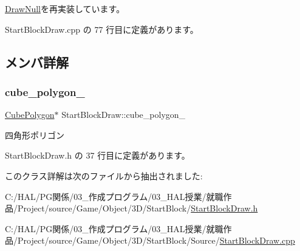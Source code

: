 \mbox{\hyperlink{class_draw_null_ad32a508d269de7eda8ad24ea72230464}{Draw\+Null}}を再実装しています。



 Start\+Block\+Draw.\+cpp の 77 行目に定義があります。



\subsection{メンバ詳解}
\mbox{\label{class_start_block_draw_a5aa6b756335a16f05c9b0d4457eb0883}} 
\subsubsection{\texorpdfstring{cube\+\_\+polygon\+\_\+}{cube\_polygon\_}}
{\footnotesize\ttfamily \mbox{\hyperlink{class_cube_polygon}{Cube\+Polygon}}$\ast$ Start\+Block\+Draw\+::cube\+\_\+polygon\+\_\+\hspace{0.3cm}{\ttfamily [private]}}



四角形ポリゴン 



 Start\+Block\+Draw.\+h の 37 行目に定義があります。



このクラス詳解は次のファイルから抽出されました\+:\begin{DoxyCompactItemize}
\item 
C\+:/\+H\+A\+L/\+P\+G関係/03\+\_\+作成プログラム/03\+\_\+\+H\+A\+L授業/就職作品/\+Project/source/\+Game/\+Object/3\+D/\+Start\+Block/\mbox{\hyperlink{_start_block_draw_8h}{Start\+Block\+Draw.\+h}}\item 
C\+:/\+H\+A\+L/\+P\+G関係/03\+\_\+作成プログラム/03\+\_\+\+H\+A\+L授業/就職作品/\+Project/source/\+Game/\+Object/3\+D/\+Start\+Block/\+Source/\mbox{\hyperlink{_start_block_draw_8cpp}{Start\+Block\+Draw.\+cpp}}\end{DoxyCompactItemize}
